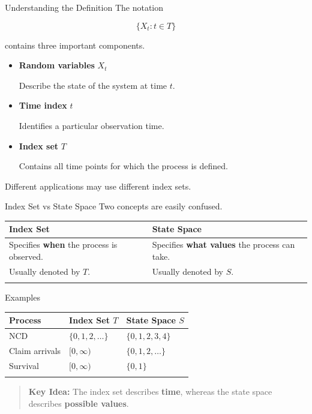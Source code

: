 \documentclass[
  ignorenonframetext,
  aspectratio=169,
]{beamer}
\newcounter{none} %
\begin{document}
\begin{frame}{Understanding the Definition}
\protect{}\label{understanding-the-definition}
The notation

\[
\{X_t:t\in T\}
\]

contains three important components.

\begin{itemize}
\item
  \textbf{Random variables} \(X_t\)

  Describe the state of the system at time \(t\).
\item
  \textbf{Time index} \(t\)

  Identifies a particular observation time.
\item
  \textbf{Index set} \(T\)

  Contains all time points for which the process is defined.
\end{itemize}

Different applications may use different index sets.
\end{frame}

\begin{frame}{Index Set vs State Space}
\protect{}\label{index-set-vs-state-space}
Two concepts are easily confused.

{\def\LTcaptype{none} %
\begin{longtable}[]{@{}
  >{\raggedright\arraybackslash}p{}
  >{\raggedright\arraybackslash}p{}@{}}
\toprule\noalign{}
\begin{minipage}[b]{\linewidth}\raggedright
Index Set
\end{minipage} & \begin{minipage}[b]{\linewidth}\raggedright
State Space
\end{minipage} \\
\midrule\noalign{}
\endhead
Specifies \textbf{when} the process is observed. & Specifies
\textbf{what values} the process can take. \\
Usually denoted by \(T\). & Usually denoted by \(S\). \\
\bottomrule\noalign{}
\end{longtable}
}

Examples

{\def\LTcaptype{none} %
\begin{longtable}[]{@{}lll@{}}
\toprule\noalign{}
Process & Index Set \(T\) & State Space \(S\) \\
\midrule\noalign{}
\endhead
NCD & \(\{0,1,2,\ldots\}\) & \(\{0,1,2,3,4\}\) \\
Claim arrivals & \([0,\infty)\) & \(\{0,1,2,\ldots\}\) \\
Survival & \([0,\infty)\) & \(\{0,1\}\) \\
\bottomrule\noalign{}
\end{longtable}
}

\begin{quote}
\textbf{Key Idea:} The index set describes \textbf{time}, whereas the
state space describes \textbf{possible values}.
\end{quote}
\end{frame}
\end{document}
